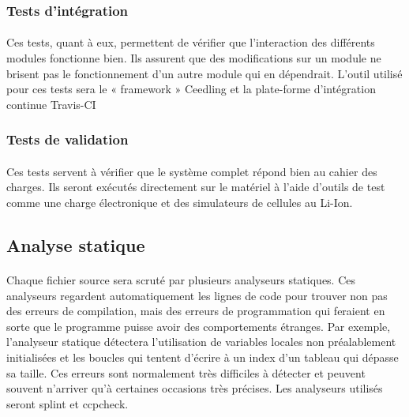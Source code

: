 		\subsubsection{Tests d'intégration}
	
			\paragraph{}
			Ces tests, quant à eux, permettent de vérifier que l’interaction des différents modules fonctionne bien. Ils assurent que des modifications sur un module ne brisent pas le fonctionnement d’un autre module qui en dépendrait. L’outil utilisé pour ces tests sera le « framework » Ceedling et la  plate-forme d’intégration continue Travis-CI
		
		\subsubsection{Tests de validation}
	
			\paragraph{}
			Ces tests servent à vérifier que le système complet répond bien au cahier des charges. Ils seront exécutés directement sur le matériel à l’aide d’outils de test comme une charge électronique et des simulateurs de cellules au Li-Ion.
	
	\subsection{Analyse statique}

		\paragraph{}
		Chaque fichier source sera scruté par plusieurs analyseurs statiques. Ces analyseurs regardent automatiquement les lignes de code pour trouver non pas des erreurs de compilation, mais des erreurs de programmation qui feraient en sorte que le programme puisse avoir des comportements étranges. Par exemple, l’analyseur statique détectera l’utilisation de variables locales non préalablement initialisées et les boucles qui tentent d’écrire à un index d’un tableau qui dépasse sa taille. Ces erreurs sont normalement très difficiles à détecter et peuvent souvent n’arriver qu’à certaines occasions très précises. Les analyseurs utilisés seront splint et ccpcheck.
	
